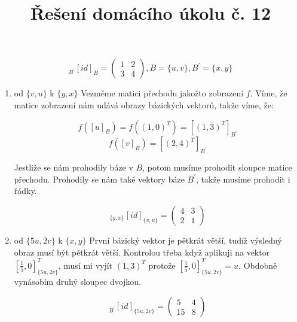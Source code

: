 \documentclass[10pt,a4paper]{article}
\title{Řešení domácího úkolu č. 12}
\date{}
\begin{document}
\maketitle

\section{} 
\begin{equation*}
{}_{B^\prime}[id]_B = \begin{pmatrix}
1 & 2 \\ 3 & 4
\end{pmatrix},
B = \{u,v\}, B^\prime = \{x,y\}
\end{equation*}

\begin{enumerate}[label=\roman*]
\item od $\{v, u\}$ k $\{y, x\}$
Vezměme matici přechodu jakožto zobrazení $f$. Víme, že matice zobrazení nám udává obrazy bázických vektorů, takže víme, že:
	
\begin{equation*}
f([u]_B) = f((1, 0)^T) =[(1, 3)^T]_{B^\prime}
\end{equation*}	
\begin{equation*}
f([v]_B) = [(2, 4)^T]_{B^\prime}
\end{equation*}

Jestliže se nám prohodily báze v $B$, potom musíme prohodit sloupce matice přechodu. Prohodily se nám také vektory báze $B^\prime$, takže musíme prohodit i řádky.

\begin{equation*}
{}_{\{y, x\}}[id]_{\{v, u\}} = \begin{pmatrix}
 4 & 3 \\2 & 1 
\end{pmatrix}
\end{equation*}

\item od $\{5u, 2v\}$ k $\{x, y\}$
První bázický vektor je pětkrát větší, tudíž výsledný obraz musí být pětkrát větší. Kontrolou třeba když aplikuji na vektor $[\frac15, 0]^T_{\{5u, 2v\}} $, musí mi vyjít $(1,3)^T$ protože $[\frac15, 0]^T_{\{5u, 2v\}} = u$. Obdobně vynásobím druhý sloupec dvojkou.

\begin{equation*}
{}_{B^\prime}[id]_{\{5u, 2v\}} = \begin{pmatrix}
 5 & 4 \\ 15 & 8 
\end{pmatrix}
\end{equation*}


\end{enumerate}
\end{document}
